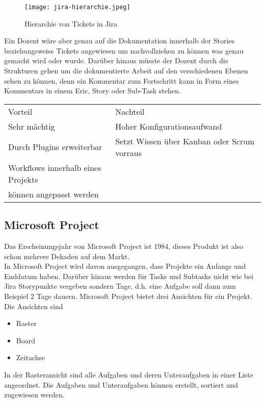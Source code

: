 \begin{figure}[H]
	\centering
	\texttt{[image: jira-hierarchie.jpeg]}
    \caption{Hierarchie von Tickets in Jira }
	\label{fig:hierarchyjira}
\end{figure}

Ein Dozent wäre aber genau auf die Dokumentation innerhalb der Stories beziehungsweise Tickets angewiesen um nachvollziehen zu können was genau gemacht wird oder wurde. Darüber hinaus müsste der Dozent durch die Strukturen gehen um die dokumentierte Arbeit auf den verschiedenen Ebenen sehen zu können, denn ein Kommentar zum Fortschritt kann in Form eines Kommentars in einem Eric, Story oder Sub-Task stehen. 

\begin{table}[]
    \begin{tabular}{ll}
    Vorteil         & Nachteil                                    \\
    Sehr mächtig    & Hoher Konfigurationsaufwand                 \\
    Durch Plugins erweiterbar   & Setzt Wissen über Kanban oder Scrum vorraus \\
    Workflows innerhalb eines Projekts\\
    können angepasst werden     &                                            
    \end{tabular}
\end{table}

\subsection{Microsoft Project}

Das Erscheinungsjahr von Microsoft Project ist 1984, dieses Produkt ist also schon mehrere Dekaden auf dem Markt.\\
In Microsoft Project wird davon ausgegangen, dass Projekte ein Anfangs und Enddatum haben. Darüber hinaus werden für Tasks und Subtasks nicht wie bei Jira Storypunkte vergeben sondern Tage, d.h. eine Aufgabe soll dann zum Beispiel 2 Tage dauern. Microsoft Project bietet drei Ansichten für ein Projekt. \\
Die Ansichten sind
\begin{itemize}
\item Raster  
\item Board  
\item Zeitachse
\end{itemize}
In der Rasteransicht sind alle Aufgaben und deren Unteraufgaben in einer Liste angeordnet. Die Aufgaben und Unteraufgaben können erstellt, sortiert und zugewiesen werden.  

